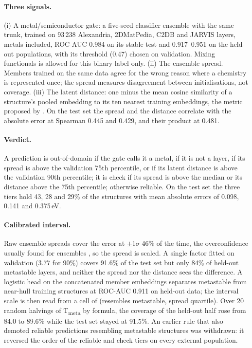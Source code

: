 \documentclass[11pt]{article}
\begin{document}
\paragraph{Three signals.} (i) A metal/semiconductor gate: a five-seed classifier
ensemble with the same trunk, trained on 93\,238 Alexandria, 2DMatPedia, C2DB and
JARVIS layers, metals included, ROC-AUC 0.984 on its stable test and 0.917--0.951 on the held-out
populations, with its threshold (0.47) chosen on validation. Mixing functionals is
allowed for this binary label only. (ii) The ensemble spread. Members trained on the
same data agree for the wrong reason where a chemistry is represented once; the spread
measures disagreement between initialisations, not coverage. (iii) The latent
distance: one minus the mean cosine similarity of a structure's pooled embedding to its
ten nearest training embeddings, the metric proposed by \citet{janet2019}. On the test
set the spread and the distance correlate with the absolute error at Spearman 0.445
and 0.429, and their product at 0.481.

\paragraph{Verdict.} A prediction is out-of-domain if the gate calls it a metal, if it
is not a layer, if its spread is above the validation 75th percentile, or if its latent
distance is above the validation 90th percentile; it is check if its spread is above
the median or its distance above the 75th percentile; otherwise reliable. On the test
set the three tiers hold 43, 28 and 29\% of the structures with mean absolute errors of
0.098, 0.141 and 0.375\,eV.

\paragraph{Calibrated interval.} Raw ensemble spreads cover the error at $\pm1\sigma$
46\% of the time, the overconfidence usually found for ensembles \citep{tran2020}, so
the spread is scaled. A single factor fitted on validation (3.77
for 90\%) covers 91.6\% of the test set but only 84\% of held-out metastable layers,
and neither the spread nor the distance sees the difference. A logistic head on the
concatenated member embeddings separates metastable from near-hull training structures
at ROC-AUC 0.911 on held-out data; the interval scale is then read from a cell of
(resembles metastable, spread quartile). Over 20 random halvings of T\textsubscript{meta}
by formula, the coverage of the held-out half rose from 84.0 to 89.6\% while the test
set stayed at 91.5\%. An earlier rule that also demoted reliable predictions resembling
metastable structures was withdrawn: it reversed the order of the reliable and check
tiers on every external population.
\end{document}

